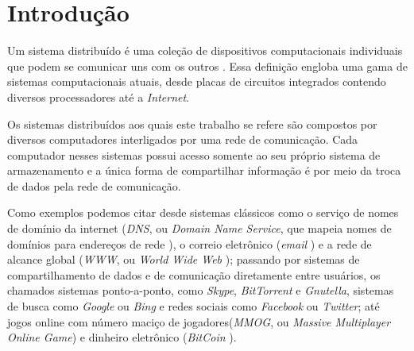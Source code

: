 \documentclass[11pt,twoside,a4paper]{book}
\begin{document}
\listoffigures
\listoftables
\listofalgorithms
\lstlistoflistings
\mainmatter

\fancyhead[RE,LO]{\thesection}

\singlespacing              %

\chapter{Introdução}
\label{chap:introducao}


Um sistema distribuído é uma coleção de dispositivos computacionais individuais que podem se comunicar uns com os outros \cite{tanenbaum, distributed_computing}. Essa definição engloba uma gama de sistemas computacionais atuais, desde placas de circuitos integrados contendo diversos processadores até a \emph{Internet}. 

Os sistemas distribuídos aos quais este trabalho se refere são compostos por diversos computadores interligados por uma rede de comunicação. Cada computador nesses sistemas possui acesso somente ao seu próprio sistema de armazenamento e a única forma de compartilhar informação é por meio da troca de dados pela rede de comunicação.

Como exemplos podemos citar desde sistemas clássicos como o serviço de nomes de domínio da internet (\emph{DNS}, ou \emph{Domain Name Service}, que mapeia nomes de domínios para endereços de rede \cite{dns}), o correio eletrônico (\emph{email} \cite{email}) e a rede de alcance global (\emph{WWW}, ou \emph{World Wide Web} \cite{www}); passando por sistemas de compartilhamento de dados e de comunicação diretamente entre usuários, os chamados sistemas ponto-a-ponto, como \emph{Skype}, \emph{BitTorrent} e \emph{Gnutella}, sistemas de busca como \emph{Google} ou \emph{Bing} e redes sociais como \emph{Facebook} ou \emph{Twitter}; até jogos online com número maciço de jogadores(\emph{MMOG}, ou \emph{Massive Multiplayer Online Game}) e dinheiro eletrônico (\emph{BitCoin} \cite{bitcoin}).
\end{document}
